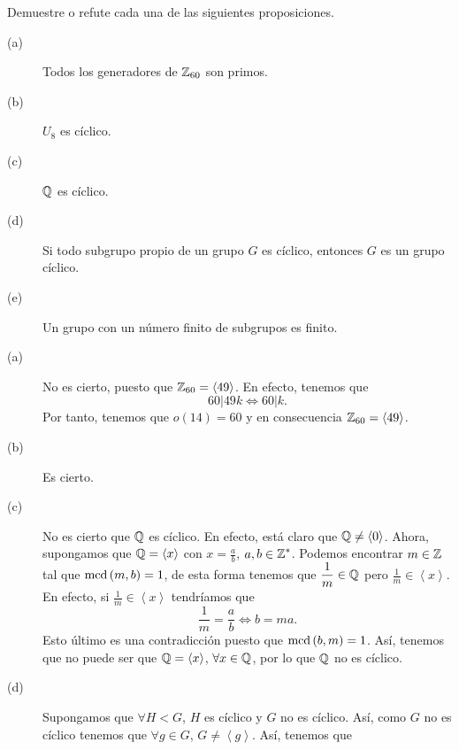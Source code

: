 \documentclass{article}
\begin{document}
\begin{ej}
Demuestre o refute cada una de las siguientes proposiciones.
\begin{description}
\item[(a)] Todos los generadores de $\displaystyle \mathbb{Z}_{60} $ son primos.
\item[(b)] $\displaystyle U_{8} $ es cíclico.
\item[(c)] $\displaystyle \mathbb{Q} $ es cíclico.
\item[(d)] Si todo subgrupo propio de un grupo $\displaystyle G $ es cíclico, entonces $\displaystyle G $ es un grupo cíclico.
\item[(e)] Un grupo con un número finito de subgrupos es finito.
\end{description}
\end{ej}

\begin{sol}
\begin{description}
\item[(a)] No es cierto, puesto que $\displaystyle \mathbb{Z}_{60} = \left\langle 49 \right\rangle  $. En efecto, tenemos que 
	\[60 | 49k \iff 60 | k .\]
	Por tanto, tenemos que $\displaystyle o\left(14\right) = 60 $ y en consecuencia $\displaystyle \mathbb{Z}_{60} = \left\langle 49 \right\rangle  $.
\item[(b)] Es cierto. 
\item[(c)] No es cierto que $\displaystyle \mathbb{Q} $ es cíclico. En efecto, está claro que $\displaystyle \mathbb{Q} \neq \left\langle 0 \right\rangle  $. Ahora, supongamos que $\displaystyle \mathbb{Q} = \left\langle x \right\rangle  $ con $\displaystyle x = \frac{a}{b} $, $\displaystyle a ,b \in \mathbb{Z}^{*} $. Podemos encontrar $\displaystyle m \in \mathbb{Z} $ tal que $\displaystyle \text{mcd}\left(m,b\right) = 1 $, de esta forma tenemos que $\displaystyle \frac{1}{m} \in \mathbb{Q} $ pero $\displaystyle \frac{1}{m} \in \left\langle x \right\rangle  $. En efecto, si $\displaystyle \frac{1}{m} \in \left\langle x \right\rangle  $ tendríamos que
	\[\frac{1}{m} = \frac{a}{b} \iff b = ma .\]
	Esto último es una contradicción puesto que $\displaystyle \text{mcd}\left(b,m\right) = 1 $. Así, tenemos que no puede ser que $\displaystyle \mathbb{Q} = \left\langle x \right\rangle  $, $\displaystyle \forall x \in \mathbb{Q} $, por lo que $\displaystyle \mathbb{Q} $ no es cíclico. 
\item[(d)] Supongamos que $\displaystyle \forall H < G $, $\displaystyle H $ es cíclico y $\displaystyle G $ no es cíclico. Así, como $\displaystyle G $ no es cíclico tenemos que $\displaystyle \forall g \in G $, $\displaystyle G \neq \left\langle g \right\rangle  $. Así, tenemos que 
\end{description}

\end{sol}
\end{document}
